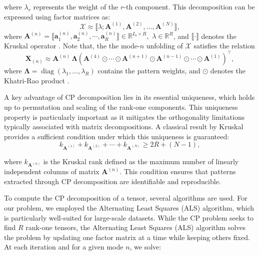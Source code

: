 \documentclass[preprint,12pt,authoryear]{elsarticle}
\begin{document}
\noindent where $\lambda_r$ represents the weight of the $r$-th component. This decomposition can be expressed using factor matrices as: 
\begin{equation}
\mathcal{X} \approx \llbracket {\lambda}; \mathbf{A}^{(1)}, \mathbf{A}^{(2)}, \ldots, \mathbf{A}^{(N)} \rrbracket,
\label{eq:kruskal-form}
\end{equation}
\noindent where
\(
\mathbf{A}^{(n)} = \llbracket\mathbf{a}_{1}^{(n)}, \mathbf{a}_{2}^{(n)}, \cdots, \mathbf{a}_{R}^{(n)} \rrbracket \in \mathbb{R}^{I_n \times R}, 
\)
$\lambda \in \mathbb{R}^{R}$, and $\llbracket \cdot \rrbracket$ denotes the Kruskal operator \citep{kruskal1977three}. Note that, 
the the mode-$n$ unfolding of $\mathcal{X}$ satisfies the relation
\begin{equation} \label{eq:mode_n_unfolding}
\mathbf{X}_{(n)} \approx \mathbf{A}^{(n)} \, \boldsymbol{\Lambda} 
\left( \mathbf{A}^{(4)} \odot \cdots \odot \mathbf{A}^{(n+1)} \odot \mathbf{A}^{(n-1)} \odot \cdots \odot \mathbf{A}^{(1)} \right)^\top,
\end{equation}
where $\boldsymbol{\Lambda} = \operatorname{diag}(\lambda_1, \dots, \lambda_R)$ contains the pattern weights, and $\odot$ denotes the Khatri-Rao product \citep{kruskal1977three}.


A key advantage of CP decomposition lies in its essential uniqueness, which holds up to permutation and scaling of the rank-one components. This uniqueness property is particularly important as it mitigates the orthogonality limitations typically associated with matrix decompositions. A classical result by Kruskal provides a sufficient condition under which this uniqueness is guaranteed:
\begin{equation}
k_{\mathbf{A}^{(1)}} + k_{\mathbf{A}^{(2)}} + \cdots + k_{\mathbf{A}^{(N)}} \geq 2R + (N-1),
\end{equation}

\noindent where $k_{\mathbf{A}^{(n)}}$ is the Kruskal rank defined as the maximum number of linearly independent columns of matrix $\mathbf{A}^{(n)}$. This condition ensures that patterns extracted through CP decomposition are identifiable and reproducible.



To compute the CP decomposition of a tensor, several algorithms are used. For our problem, we employed the Alternating Least Squares (ALS) algorithm, which is particularly well-suited for large-scale datasets. While the CP problem seeks to find $R$ rank-one tensors, 
the Alternating Least Squares (ALS) algorithm solves the problem by updating one factor matrix at a time while keeping others fixed. At each iteration and for a given mode $n$, we solve:
\end{document}
